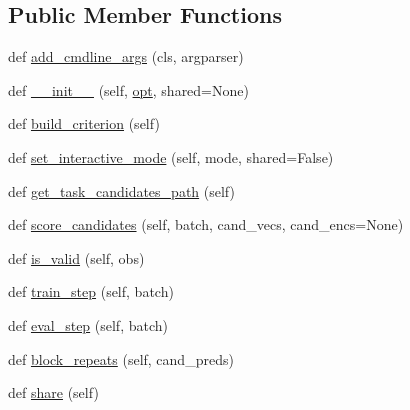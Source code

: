 \subsection*{Public Member Functions}
\begin{DoxyCompactItemize}
\item 
def \hyperlink{classparlai_1_1core_1_1torch__ranker__agent_1_1TorchRankerAgent_a8b16043428bbb29ee4a3ed28c2bbb472}{add\+\_\+cmdline\+\_\+args} (cls, argparser)
\item 
def \hyperlink{classparlai_1_1core_1_1torch__ranker__agent_1_1TorchRankerAgent_acde404a79bf3678bb52d3e6c3ee5244a}{\+\_\+\+\_\+init\+\_\+\+\_\+} (self, \hyperlink{classparlai_1_1core_1_1torch__agent_1_1TorchAgent_a785bb920cf8c8afc3e9bf6a8b77e335a}{opt}, shared=None)
\item 
def \hyperlink{classparlai_1_1core_1_1torch__ranker__agent_1_1TorchRankerAgent_a16d004a75c5fee42cd13db4abe157b98}{build\+\_\+criterion} (self)
\item 
def \hyperlink{classparlai_1_1core_1_1torch__ranker__agent_1_1TorchRankerAgent_a9b90f2718c85b6373ead4cd207cfd3d8}{set\+\_\+interactive\+\_\+mode} (self, mode, shared=False)
\item 
def \hyperlink{classparlai_1_1core_1_1torch__ranker__agent_1_1TorchRankerAgent_a936cebe646816609dd1d4f56b9490d45}{get\+\_\+task\+\_\+candidates\+\_\+path} (self)
\item 
def \hyperlink{classparlai_1_1core_1_1torch__ranker__agent_1_1TorchRankerAgent_a65d5726a4e2098212298bc2cdf13e70f}{score\+\_\+candidates} (self, batch, cand\+\_\+vecs, cand\+\_\+encs=None)
\item 
def \hyperlink{classparlai_1_1core_1_1torch__ranker__agent_1_1TorchRankerAgent_a3a80c3eb68b019859da2a83706c3844d}{is\+\_\+valid} (self, obs)
\item 
def \hyperlink{classparlai_1_1core_1_1torch__ranker__agent_1_1TorchRankerAgent_a05ddf921f386f21116ec0ef50796987a}{train\+\_\+step} (self, batch)
\item 
def \hyperlink{classparlai_1_1core_1_1torch__ranker__agent_1_1TorchRankerAgent_a65bca7841123e4c3df1e09f8c4eb397f}{eval\+\_\+step} (self, batch)
\item 
def \hyperlink{classparlai_1_1core_1_1torch__ranker__agent_1_1TorchRankerAgent_a628050d71339298baafbaf678f94207d}{block\+\_\+repeats} (self, cand\+\_\+preds)
\item 
def \hyperlink{classparlai_1_1core_1_1torch__ranker__agent_1_1TorchRankerAgent_a9ba5899b6497645bb6d406ecc2441da7}{share} (self)
\item 

\end{DoxyCompactItemize}
